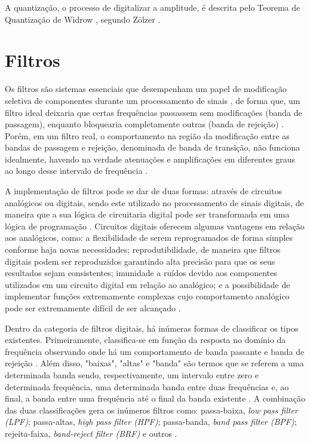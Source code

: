 A quantização, o processo de digitalizar a amplitude, é descrita pelo Teorema de Quantização de Widrow \cite{widrow}, segundo Zölzer \cite{zolzer2008digital}.

\section{Filtros}


Os filtros são sistemas essenciais que desempenham um papel de modificação seletiva de componentes durante um processamento de sinais \cite{oppenheim2013processamento}, de forma que, um filtro ideal deixaria que certas frequências passassem sem modificações (banda de passagem), enquanto bloquearia completamente outras (banda de rejeição) \cite{oppenheim2013processamento}. Porém, em um filtro real, o comportamento na região da modificação entre as bandas de passagem e rejeição, denominada de banda de transição, não funciona idealmente, havendo na verdade atenuações e amplificações em diferentes graus ao longo desse intervalo de frequência \cite{oppenheim2013processamento}.

A implementação de filtros pode se dar de duas formas: através de circuitos analógicos ou digitais, sendo este utilizado no processamento de sinais digitais, de maneira que a sua lógica de circuitaria digital pode ser transformada em uma lógica de programação \cite{oppenheim2013processamento}. Circuitos digitais oferecem algumas vantagens em relação aos analógicos, como: a flexibilidade de serem reprogramados de forma simples conforme haja novas necessidades; reprodutibilidade, de maneira que filtros digitais podem ser reproduzidos garantindo alta precisão para que os seus resultados sejam consistentes; imunidade a ruídos devido aos componentes utilizados em um circuito digital em relação ao analógico; e a possibilidade de implementar funções extremamente complexas cujo comportamento analógico pode ser extremamente difícil de ser alcançado \cite{oppenheim2013processamento}.

Dentro da categoria de filtros digitais, há inúmeras formas de classificar os tipos existentes. Primeiramente, classifica-se em função da resposta no domínio da frequência observando onde há um comportamento de banda passante e banda de rejeição \cite{oppenheim2013processamento}. Além disso, "baixas", "altas" e "banda" são termos que se referem a uma determinada banda sendo, respectivamente, um intervalo entre zero e determinada frequência, uma determinada banda entre duas frequências e, ao final, a banda entre uma frequência até o final da banda existente \cite{oppenheim2013processamento}. A combinação das duas classificações gera os inúmeros filtros como: passa-baixa, \textit{low pass filter (LPF)}; passa-altas, \textit{high pass filter (HPF)}; passa-banda, \textit{band pass filter (BPF)}; rejeita-faixa, \textit{band-reject filter (BRF)} e outros \cite{oppenheim2013processamento}.


